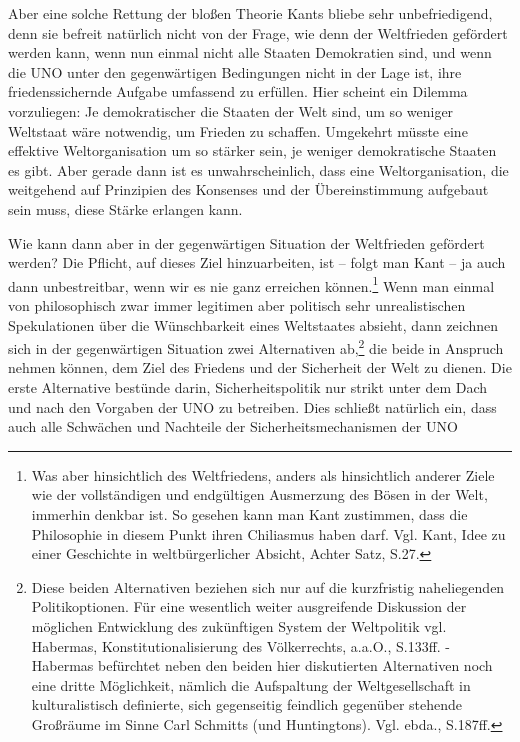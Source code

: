 \documentclass[12pt,a4paper,ngerman]{article}
\begin{document}
Aber eine solche Rettung der bloßen Theorie Kants bliebe sehr
unbefriedigend, denn sie befreit natürlich nicht von der Frage, wie
denn der Weltfrieden gefördert werden kann, wenn nun einmal nicht
alle Staaten Demokratien sind, und wenn die UNO unter den
gegenwärtigen Bedingungen nicht in der Lage ist, ihre
friedenssichernde Aufgabe umfassend zu erfüllen.  Hier scheint ein
Dilemma vorzuliegen: Je demokratischer die Staaten der Welt sind, um
so weniger Weltstaat wäre notwendig, um Frieden zu schaffen. Umgekehrt
müsste eine effektive Weltorganisation um so stärker sein, je weniger
demokratische Staaten es gibt. Aber gerade dann ist es
unwahrscheinlich, dass eine Weltorganisation, die weitgehend auf
Prinzipien des Konsenses und der Übereinstimmung aufgebaut sein muss,
diese Stärke erlangen kann.

Wie kann dann aber in der gegenwärtigen Situation der Weltfrieden
gefördert werden? Die Pflicht, auf dieses Ziel hinzuarbeiten, ist -- 
folgt man Kant -- ja auch dann unbestreitbar, wenn wir es nie ganz
erreichen können.\footnote{Was aber hinsichtlich des Weltfriedens,
  anders als hinsichtlich anderer Ziele wie der vollständigen und
  endgültigen Ausmerzung des Bösen in der Welt, immerhin denkbar ist.
  So gesehen kann man Kant zustimmen, dass die Philosophie in diesem
  Punkt ihren Chiliasmus haben darf. Vgl. Kant, Idee zu einer
  Geschichte in weltbürgerlicher Absicht, Achter Satz, S.27.} Wenn man
einmal von philosophisch zwar immer legitimen aber politisch sehr
unrealistischen Spekulationen über die Wünschbarkeit eines Weltstaates
absieht, dann zeichnen sich in der gegenwärtigen Situation zwei
Alternativen ab,\footnote{Diese beiden Alternativen beziehen sich nur
  auf die kurzfristig naheliegenden Politikoptionen. Für eine
  wesentlich weiter ausgreifende Diskussion der möglichen Entwicklung
  des zukünftigen System der Weltpolitik vgl. Habermas,
  Konstitutionalisierung des Völkerrechts, a.a.O., S.133ff. - Habermas
  befürchtet neben den beiden hier diskutierten Alternativen noch eine
  dritte Möglichkeit, nämlich die Aufspaltung der Weltgesellschaft in
  kulturalistisch definierte, sich gegenseitig feindlich gegenüber
  stehende Großräume im Sinne Carl Schmitts (und Huntingtons). Vgl.
  ebda., S.187ff.} die beide in Anspruch nehmen können, dem Ziel des
Friedens und der Sicherheit der Welt zu dienen. Die erste Alternative
bestünde darin, Sicherheitspolitik nur strikt unter dem Dach und nach
den Vorgaben der UNO zu betreiben. Dies schließt natürlich ein, dass
auch alle Schwächen und Nachteile der Sicherheitsmechanismen der UNO
\end{document}
